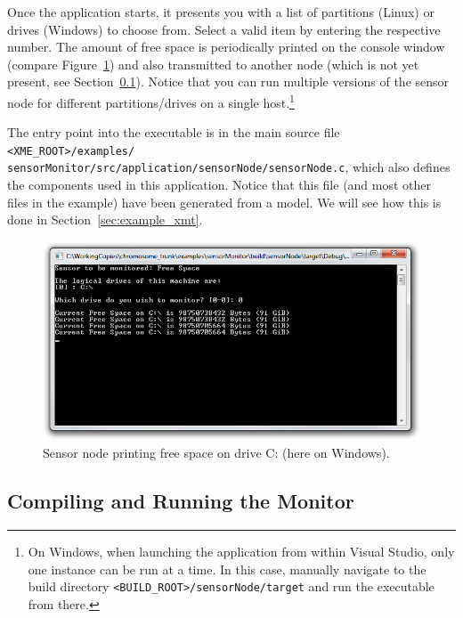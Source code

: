 Once the application starts, it presents you with a list of partitions (Linux) or drives (Windows) to choose from.
Select a valid item by entering the respective number.
%
The amount of free space is periodically printed on the console window (compare Figure~\ref{fig:example_sensorNode})
and also transmitted to another \xme node (which is not yet present, see Section~\ref{sec:example_sensorMonitor:monitorNode}).
%
Notice that you can run multiple versions of the sensor node for different partitions/drives on a single host.\footnote{%
	On Windows, when launching the application from within Visual Studio, only one instance can be run at a time.
	In this case, manually navigate to the build directory \texttt{<BUILD\_ROOT>/sensorNode/target} and run the executable from there.
}

The entry point into the executable is in the main source file \verb|<XME_ROOT>/examples/|
\verb|sensorMonitor/src/application/sensorNode/sensorNode.c|,
which also defines the \xme components used in this application.
Notice that this file (and most other files in the example) have been generated from a model.
We will see how this is done in Section~\ref{sec:example_xmt}.
%

\begin{figure}[htpb]
	\centering
	\includegraphics[scale=0.75]{figures/example_sensorNode.png}
	\caption{Sensor node printing free space on drive C: (here on Windows).}
	\label{fig:example_sensorNode}
\end{figure}

\subsection{Compiling and Running the Monitor}
\label{sec:example_sensorMonitor:monitorNode}

